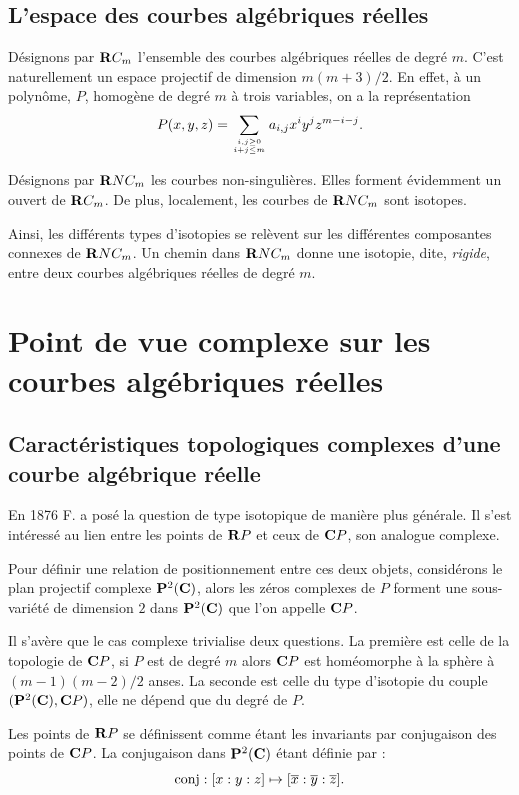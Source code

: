 \documentclass{livre}
\begin{document}
\section{L'espace des courbes algébriques réelles}

Désignons par $\mathbf{R} C_m$ l'ensemble des courbes algébriques réelles de degré $m$. C'est naturellement un espace projectif de dimension $m(m+3)/2$. En effet, à un polynôme, $P$, homogène de degré $m$ à trois variables, on a la représentation \[ P(x,y,z) = \sum_{i,j\geq 0\atop i+j \leq m} a_{i,j}x^{i}y^{j}z^{m-i-j}. \]

Désignons par $\mathbf{R} NC_m$ les courbes non-singulières. Elles forment évidemment un ouvert de $\mathbf{R} C_m$. De plus, localement, les courbes de $\mathbf{R} NC_m$ sont isotopes.

Ainsi, les différents types d'isotopies se relèvent sur les différentes composantes connexes de $\mathbf{R} NC_m$. Un chemin dans $\mathbf{R} NC_m$ donne une isotopie, dite, \emph{rigide}, entre deux courbes algébriques réelles de degré $m$.

\chapter{Point de vue complexe sur les courbes algébriques réelles}

\section{Caractéristiques topologiques complexes d'une courbe algébrique réelle}

En 1876 F.  a posé la question de type isotopique de manière plus générale. Il s'est intéressé au lien entre les points de $\mathbf{R} P$ et ceux de $\mathbf{C} P$, son analogue complexe.

Pour définir une relation de positionnement entre ces deux objets, considérons le plan projectif complexe $\mathbf{P}^{2}(\mathbf{C})$, alors les zéros complexes de $P$ forment une sous-variété de dimension $2$ dans $\mathbf{P}^{2}(\mathbf{C})$ que l'on appelle $\mathbf{C} P$.

Il s'avère que le cas complexe trivialise deux questions. La première est celle de la topologie de $\mathbf{C} P$, si $P$ est de degré $m$ alors $\mathbf{C} P$ est homéomorphe à la sphère à $(m-1)(m-2)/2$ anses. La seconde est celle du type d'isotopie du couple $(\mathbf{P}^{2}(\mathbf{C}), \mathbf{C} P)$, elle ne dépend que du degré de $P$.



Les points de $\mathbf{R} P$ se définissent comme étant les invariants par conjugaison des points de $\mathbf{C} P$. La conjugaison dans $\mathbf{P}^{2}(\mathbf{C})$ étant définie par : \[\mathrm{conj}: [x:y:z]\mapsto [\overline{x}:\overline{y}:\overline{z}]. \]
\end{document}
